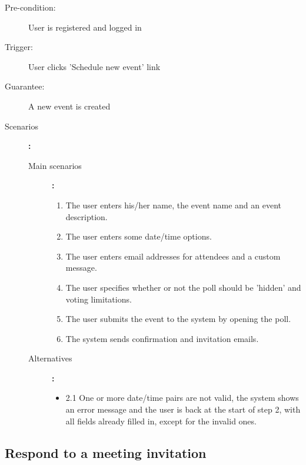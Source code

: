 \begin{description}
	\item[Pre-condition:] User is registered and logged in
	\item[Trigger:] User clicks 'Schedule new event' link
	\item[Guarantee:] A new event is created
	\item[Scenarios]\textbf{:}\\
				\begin{description}
					\item[Main scenarios]\textbf{:}\\
								\begin{enumerate}
									\item The user enters his/her name, the event name and an event description.
									\item The user enters some date/time options.
									\item The user enters email addresses for attendees and a custom message.
									\item The user specifies whether or not the poll should be 'hidden' and voting limitations.
									\item The user submits the event to the system by opening the poll.
									\item The system sends confirmation and invitation emails.
								\end{enumerate}
					\item[Alternatives]\textbf{:}\\
								\begin{itemize}
									\item 2.1 One or more date/time pairs are not valid, the system shows an error message and the user is back at the start of step 2, with all fields already filled in, except for the invalid ones.
								\end{itemize}
				\end{description}
\end{description}


\subsection{Respond to a meeting invitation}

